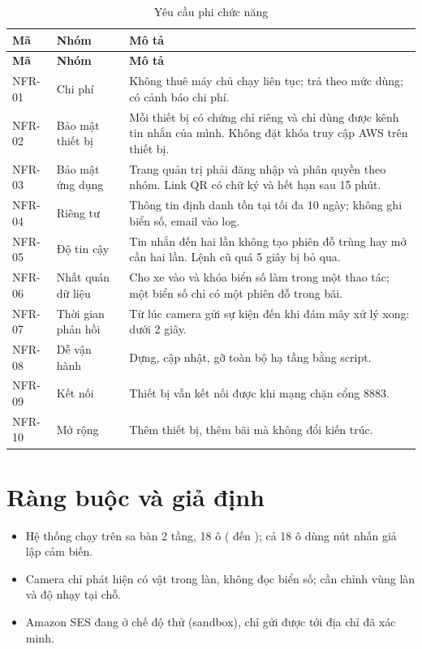 \begin{longtable}{@{}P{1.5cm}P{3cm}P{9.6cm}@{}}
\caption{Yêu cầu phi chức năng}\label{tab:nfr}\\
\toprule
\textbf{Mã} & \textbf{Nhóm} & \textbf{Mô tả} \\ \midrule
\endfirsthead
\toprule
\textbf{Mã} & \textbf{Nhóm} & \textbf{Mô tả} \\ \midrule
\endhead
NFR-01 & Chi phí & Không thuê máy chủ chạy liên tục; trả theo mức dùng; có cảnh báo chi phí. \\
NFR-02 & Bảo mật thiết bị & Mỗi thiết bị có chứng chỉ riêng và chỉ dùng được kênh tin nhắn của mình. Không đặt khóa truy cập AWS trên thiết bị. \\
NFR-03 & Bảo mật ứng dụng & Trang quản trị phải đăng nhập và phân quyền theo nhóm. Link QR có chữ ký và hết hạn sau 15 phút. \\
NFR-04 & Riêng tư & Thông tin định danh tồn tại tối đa 10 ngày; không ghi biển số, email vào log. \\
NFR-05 & Độ tin cậy & Tin nhắn đến hai lần không tạo phiên đỗ trùng hay mở cần hai lần. Lệnh cũ quá 5 giây bị bỏ qua. \\
NFR-06 & Nhất quán dữ liệu & Cho xe vào và khóa biển số làm trong một thao tác; một biển số chỉ có một phiên đỗ trong bãi. \\
NFR-07 & Thời gian phản hồi & Từ lúc camera gửi sự kiện đến khi đám mây xử lý xong: dưới 2 giây. \\
NFR-08 & Dễ vận hành & Dựng, cập nhật, gỡ toàn bộ hạ tầng bằng script. \\
NFR-09 & Kết nối & Thiết bị vẫn kết nối được khi mạng chặn cổng 8883. \\
NFR-10 & Mở rộng & Thêm thiết bị, thêm bãi mà không đổi kiến trúc. \\
\bottomrule
\end{longtable}

\section{Ràng buộc và giả định}

\begin{itemize}
  \item Hệ thống chạy trên sa bàn 2 tầng, 18 ô ( đến ); cả 18 ô dùng nút nhấn giả lập cảm biến.
  \item Camera chỉ phát hiện có vật trong làn, không đọc biển số; cần chỉnh vùng làn và độ nhạy tại chỗ.
  \item Amazon SES đang ở chế độ thử (sandbox), chỉ gửi được tới địa chỉ đã xác minh.
\end{itemize}
